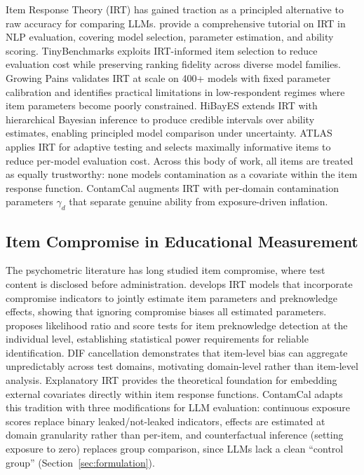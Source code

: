 Item Response Theory (IRT) has gained traction as a principled alternative to raw accuracy for comparing LLMs. \citet{lalor_2024_irt_nlp} provide a comprehensive tutorial on IRT in NLP evaluation, covering model selection, parameter estimation, and ability scoring. TinyBenchmarks \citep{polo_2024_tinybenchmarks} exploits IRT-informed item selection to reduce evaluation cost while preserving ranking fidelity across diverse model families. Growing Pains \citep{habba_2025_growing_pains} validates IRT at scale on 400+ models with fixed parameter calibration and identifies practical limitations in low-respondent regimes where item parameters become poorly constrained. HiBayES \citep{luettgau_2025_hibayes} extends IRT with hierarchical Bayesian inference to produce credible intervals over ability estimates, enabling principled model comparison under uncertainty. ATLAS \citep{li_2024_atlas} applies IRT for adaptive testing and selects maximally informative items to reduce per-model evaluation cost. Across this body of work, all items are treated as equally trustworthy: none models contamination as a covariate within the item response function. ContamCal augments IRT with per-domain contamination parameters $\gamma_d$ that separate genuine ability from exposure-driven inflation.

\subsection{Item Compromise in Educational Measurement}

The psychometric literature has long studied item compromise, where test content is disclosed before administration. \citet{eckerly_2017_item_compromise} develops IRT models that incorporate compromise indicators to jointly estimate item parameters and preknowledge effects, showing that ignoring compromise biases all estimated parameters. \citet{sinharay_2017_preknowledge} proposes likelihood ratio and score tests for item preknowledge detection at the individual level, establishing statistical power requirements for reliable identification. DIF cancellation \citep{ercikan_2008_dif_cancellation} demonstrates that item-level bias can aggregate unpredictably across test domains, motivating domain-level rather than item-level analysis. Explanatory IRT \citep{deboeck_2004_explanatory_irt} provides the theoretical foundation for embedding external covariates directly within item response functions. ContamCal adapts this tradition with three modifications for LLM evaluation: continuous exposure scores replace binary leaked/not-leaked indicators, effects are estimated at domain granularity rather than per-item, and counterfactual inference (setting exposure to zero) replaces group comparison, since LLMs lack a clean ``control group'' (Section~\ref{sec:formulation}).


